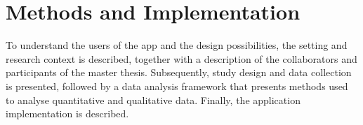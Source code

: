 \chapter{Methods and Implementation}\label{cha:Method}





To understand the users of the app and the design possibilities, the setting and research context is described, together with a description of the collaborators and participants of the master thesis. Subsequently, study design and data collection is presented, followed by a data analysis framework that presents methods used to analyse quantitative and qualitative data. Finally, the application implementation is described.












